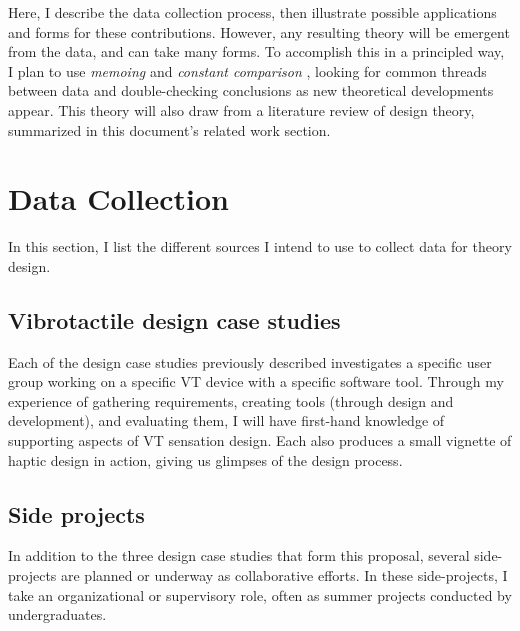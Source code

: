 Here, I describe the data collection process, then illustrate possible applications and forms for these contributions.
However, any resulting theory will be emergent from the data, and can take many forms.
To accomplish this in a principled way, I plan to use \emph{memoing} and \emph{constant comparison} \cite{Corbin2008}, looking for common threads between data and double-checking conclusions as new theoretical developments appear.
This theory will also draw from a literature review of design theory, summarized in this document's related work section.




%
%
\section{Data Collection}
In this section, I list the different sources I intend to use to collect data for theory design.

\subsection{Vibrotactile design case studies}
Each of the  design case studies previously described investigates a specific user group working on a specific VT device with a specific software tool.
Through my experience of gathering requirements, creating tools (through design and development), and evaluating them, I will have first-hand knowledge of supporting aspects of VT sensation design.
Each also produces a small vignette of haptic design in action, giving us glimpses of the design process.

\subsection{Side projects}
In addition to the three design case studies that form this proposal, several side-projects are planned or underway as collaborative efforts.
In these side-projects, I take an organizational or supervisory role, often as summer projects conducted by undergraduates.


